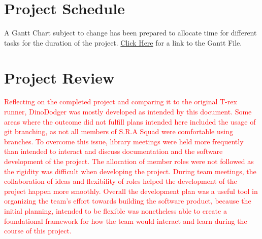 \documentclass{article}
\begin{document}
\section{Project Schedule}

A Gantt Chart subject to change has been prepared to allocate time for different tasks for the duration of the project. \href{Gantt_Project_DinoDodger_v1.gan}{Click Here} for a link to the Gantt File.

\section{Project Review}
\textcolor{red}{Reflecting on the completed project and comparing it to the original T-rex runner, DinoDodger was mostly developed as intended by this document. Some areas where the outcome did not fulfill plans intended here included the usage of git branching, as not all members of S.R.A Squad were comfortable using branches. To overcome this issue, library meetings were held more frequently than intended to interact and discuss documentation and the software development of the project. The allocation of member roles were not followed as the rigidity was difficult when developing the project. During team meetings, the collaboration of ideas and flexibility of roles helped the development of the project happen more smoothly. Overall the development plan was a useful tool in organizing the team's effort towards building the software product, because the initial planning, intended to be flexible was nonetheless able to create a foundational framework for how the team would interact and learn during the course of this project.}
\end{document}

